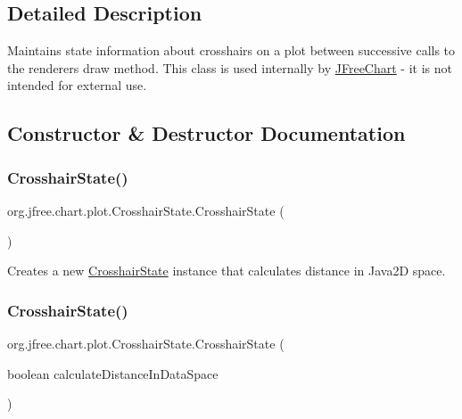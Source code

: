 \subsection{Detailed Description}
Maintains state information about crosshairs on a plot between successive calls to the renderer\textquotesingle{}s draw method. This class is used internally by \mbox{\hyperlink{classorg_1_1jfree_1_1chart_1_1_j_free_chart}{J\+Free\+Chart}} -\/ it is not intended for external use. 

\subsection{Constructor \& Destructor Documentation}
\mbox{\label{classorg_1_1jfree_1_1chart_1_1plot_1_1_crosshair_state_ad905fdb001c13d43788d157d0496c89e}} 
\subsubsection{\texorpdfstring{Crosshair\+State()}{CrosshairState()}\hspace{0.1cm}{\footnotesize\ttfamily [1/2]}}
{\footnotesize\ttfamily org.\+jfree.\+chart.\+plot.\+Crosshair\+State.\+Crosshair\+State (\begin{DoxyParamCaption}{ }\end{DoxyParamCaption})}

Creates a new {\ttfamily \mbox{\hyperlink{classorg_1_1jfree_1_1chart_1_1plot_1_1_crosshair_state}{Crosshair\+State}}} instance that calculates distance in Java2D space. \mbox{\label{classorg_1_1jfree_1_1chart_1_1plot_1_1_crosshair_state_adfa71f56b226779ee4b4998060a0e7f1}} 
\subsubsection{\texorpdfstring{Crosshair\+State()}{CrosshairState()}\hspace{0.1cm}{\footnotesize\ttfamily [2/2]}}
{\footnotesize\ttfamily org.\+jfree.\+chart.\+plot.\+Crosshair\+State.\+Crosshair\+State (\begin{DoxyParamCaption}\item[{boolean}]{calculate\+Distance\+In\+Data\+Space }\end{DoxyParamCaption})}

